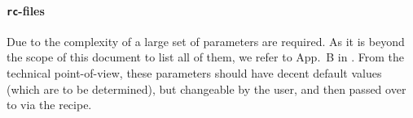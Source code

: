 \paragraph{\texttt{rc}-files}\label{app:mf_model_rc}
Due to the complexity of \mf a large set of parameters are required. As it is beyond the scope of this document to list all of them, we refer to App.~B in \cite{molecfit}. From the technical point-of-view, these parameters should have decent default values (which are to be determined), but changeable by the user, and then passed over to \mf  via the recipe. 

